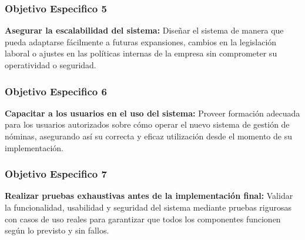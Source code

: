 \subsubsection*{Objetivo Especifico 5}
\textbf{Asegurar la escalabilidad del sistema:} Diseñar el sistema de manera que
pueda adaptarse fácilmente a futuras expansiones, cambios en la legislación
laboral o ajustes en las políticas internas de la empresa sin comprometer su
operatividad o seguridad.

\subsubsection*{Objetivo Especifico 6}
\textbf{Capacitar a los usuarios en el uso del sistema:} Proveer formación adecuada
para los usuarios autorizados sobre cómo operar el nuevo sistema de gestión
de nóminas, asegurando así su correcta y eficaz utilización desde el momento
de su implementación.

\subsubsection*{Objetivo Especifico 7}
\textbf{Realizar pruebas exhaustivas antes de la implementación final:} Validar la
funcionalidad, usabilidad y seguridad del sistema mediante pruebas rigurosas
con casos de uso reales para garantizar que todos los componentes funcionen
según lo previsto y sin fallos.
